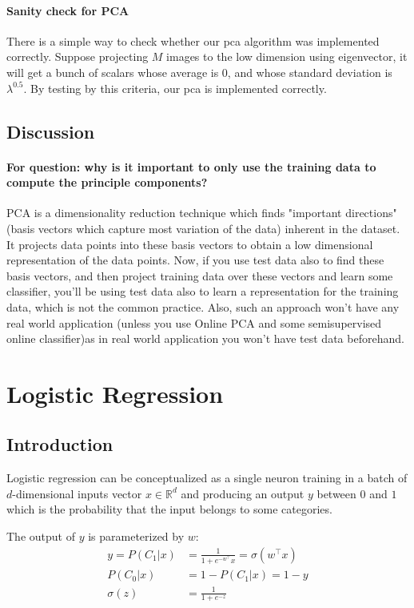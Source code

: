 \documentclass{article}
\begin{document}
\paragraph{Sanity check for PCA} There is a simple way to check whether our pca algorithm was implemented correctly. Suppose projecting $M$ images to the low dimension using eigenvector, it will get a bunch of scalars whose average is 0, and whose standard deviation is $\lambda^{0.5}$. By testing by this criteria, our pca is implemented correctly.
\subsection{Discussion}
\paragraph{For question: why is it important to only use the training data to compute the principle components?
}
PCA is a dimensionality reduction technique which finds "important directions" (basis vectors which capture most variation of the data) inherent in the dataset. It projects data points into these basis vectors to obtain a low dimensional representation of the data points. Now, if you use test data also to find these basis vectors, and then project training data over these vectors and learn some classifier, you'll be using test data also to learn a representation for the training data, which is not the common practice. Also, such an approach won't have any real world application (unless you use Online PCA and some semisupervised online classifier)as in real world application you won't have test data beforehand.

\section{Logistic Regression}

\subsection{Introduction}

Logistic regression can be conceptualized as a single neuron training in a batch of $d$-dimensional inputs vector $x\in \mathbb{R}^{d}$ and producing an output $y$ between $0$ and $1$ which is the probability that the input belongs to some categories.

The output of $y$ is parameterized by $w$:
\begin{align}
    y = P(C_{1}|x) &= \frac{1}{1+e^{-w^{\top}}x} = \sigma(w^{\top}x) \\
    P(C_{0}|x) &= 1 - P(C_{1}|x) = 1 - y \\
    \sigma(z) &= \frac{1}{1+e^{-z}}
\end{align}
\end{document}
